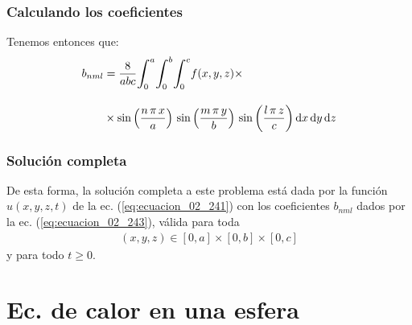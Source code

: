 \documentclass[12pt]{beamer}
\begin{document}
\begin{frame}
\frametitle{Calculando los coeficientes}
Tenemos entonces que:
\begin{align}
\begin{aligned}
b_{nml} &= \dfrac{8}{abc} \scaleint{6ex}_{\bs 0}^{a} \scaleint{6ex}_{\bs 0}^{b} \scaleint{6ex}_{\bs 0}^{c} f (x, y, z) \times \\[1em]
&\times \sin \left( \dfrac{n \, \pi \, x}{a} \right) \, \sin \left( \dfrac{m \, \pi \, y}{b} \right) \, \sin \left( \dfrac{l \, \pi \, z}{c} \right) \dd{x} \dd{y} \dd{z}
\end{aligned}
\label{eq:ecuacion_02_243}
\end{align}
\end{frame}
\begin{frame}
\frametitle{Solución completa}
De esta forma, la solución completa a este problema está dada por la función $u(x, y, z, t)$ de la ec. (\ref{eq:ecuacion_02_241}) con los coeficientes $b_{nml}$ dados por la ec. (\ref{eq:ecuacion_02_243}), válida para toda 
\begin{align}
(x, y, z) \in [0, a] \times [0, b] \times [0, c]
\end{align} 
y para todo $t \geq 0$.
\end{frame}

\section{Ec. de calor en una esfera}
\end{document}
